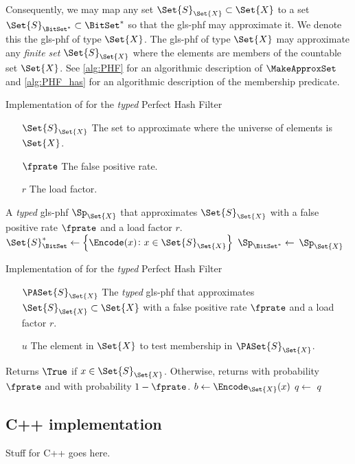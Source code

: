 \documentclass[ ../main.tex]{subfiles}
\begin{document}
Consequently, we may map any set $\Set{S}_{\Set{X}} \subset \Set{X}$ to a set $\Set{S}_{\BitSet^{*}} \subset \BitSet^{*}$ so that the \gls{gls-phf} may approximate it.
We denote this the \gls{gls-phf} of type $\Set{X}$.
The \gls{gls-phf} of type $\Set{X}$ may approximate any \emph{finite set} $\Set{S}_{\Set{X}}$ where the elements are members of the countable set $\Set{X}$.
See \cref{alg:PHF} for an algorithmic description of $\MakeApproxSet$ and \cref{alg:PHF_has} for an algorithmic description of the membership predicate.
\begin{algorithm}[h]
    \caption{Implementation of \protect\MakeApproxSet for the \emph{typed} Perfect Hash Filter}
    \label{alg:typedPHF}
    \KwIn
    {
        \begin{itemize}
            \item[$\Set{S}_{\Set{X}}$] The set to approximate where the universe of elements is $\Set{X}$.
            \item[$\fprate$] The false positive rate.
            \item[$r$] The load factor.
        \end{itemize}
    }
    \KwOut
    {
        A \emph{typed} \gls{gls-phf} $\Sp_{\Set{X}}$ that approximates $\Set{S}_{\Set{X}}$ with a false positive rate $\fprate$ and a load factor $r$.
    }
    {
        $\Set{S}_\BitSet^{*} \gets \left\{ \Encode(x) \colon x \in \Set{S}_{\Set{X}}\right\}$\;
        $\Sp_{\BitSet^{*}} \gets$ \;
        \Return $\Sp_{\Set{X}}$\;
    }
\end{algorithm}
\begin{algorithm}[h]
    \caption{Implementation of \protect\Contains for the \emph{typed} Perfect Hash Filter}
    \label{alg:typed_PHF_contains}
    \KwIn
    {
        \begin{itemize}
            \item[$\PASet{S}_{\Set{X}}$] The \emph{typed} \gls{gls-phf} that approximates $\Set{S}_{\Set{X}} \subset \Set{X}$ with a false positive rate $\fprate$ and a load factor $r$.
            \item[$u$] The element in $\Set{X}$ to test membership in $\PASet{S}_{\Set{X}}$.
        \end{itemize}
    }
    \KwOut
    {
        Returns $\True$ if $x \in \Set{S}_{\Set{X}}$. Otherwise, returns \True with probability $\fprate$ and \False with probability $1 - \fprate$.
    }
    {
        $b \gets \Encode_\Set{X}(x)$\;
        $q \gets$ \;
        \Return $q$\;
    }
\end{algorithm}

\subsection{C++ implementation}
Stuff for C++ goes here.
\end{document}
